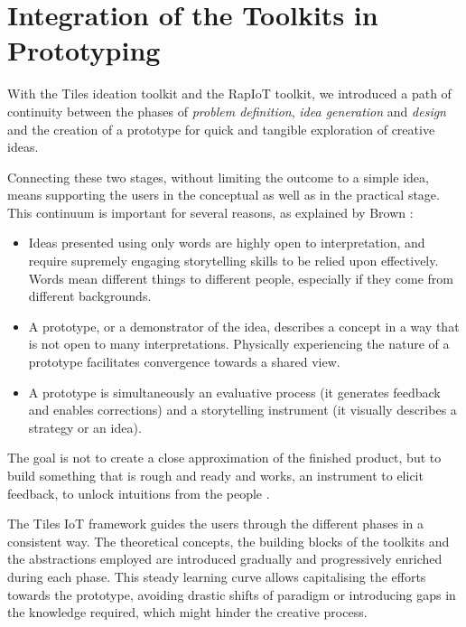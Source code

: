 \section{Integration of the Toolkits in Prototyping}
\label{sec:integration-proto}

With the Tiles ideation toolkit and the RapIoT toolkit, we introduced a path of continuity between the phases of \textit{problem definition}, \textit{idea generation} and \textit{design} and the creation of a prototype for quick and tangible exploration of creative ideas.

Connecting these two stages, without limiting the outcome to a simple idea, means supporting the users in the conceptual as well as in the practical stage. This continuum is important for several reasons, as explained by Brown \autocite*{brown_strategy_2005}:

\begin{itemize}
    \item Ideas presented using only words are highly open to interpretation, and require supremely engaging storytelling skills to be relied upon effectively. Words mean different things to different people, especially if they come from different backgrounds.
    \item A prototype, or a demonstrator of the idea, describes a concept in a way that is not open to many interpretations. Physically experiencing the nature of a prototype facilitates convergence towards a shared view.
    \item A prototype is simultaneously an evaluative process (it generates feedback and enables corrections) and a storytelling instrument (it visually describes a strategy or an idea).
\end{itemize}

The goal is not to create a close approximation of the finished product, but to build something that is rough and ready and works, an instrument to elicit feedback, to unlock intuitions from the people \autocite{brown_strategy_2005}.

The Tiles IoT framework guides the users through the different phases in a consistent way. The theoretical concepts, the building blocks of the toolkits and the abstractions employed are introduced gradually and progressively enriched during each phase. This steady learning curve allows capitalising the efforts towards the prototype, avoiding drastic shifts of paradigm or introducing gaps in the knowledge required, which might hinder the creative process.

